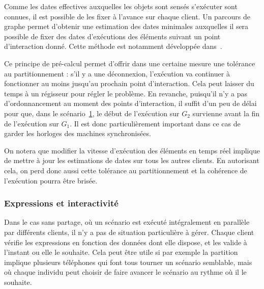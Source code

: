 \documentclass[10pt]{article}
\newcommand\trigger{point d'interaction\xspace}
\begin{document}
Comme les dates effectives auxquelles les objets sont sensés s'exécuter sont connues, il est possible de les fixer à l'avance sur chaque client. 
Un parcours de graphe permet d'obtenir une estimation des dates minimales auxquelles il sera possible de fixer des dates d'exécutions des éléments suivant un point d'interaction donné. 
Cette méthode est notamment développée dans~\cite{celerier2016rethinking}.

Ce principe de pré-calcul permet d'offrir dans une certaine mesure une tolérance au partitionnement : s'il y a une déconnexion, l'exécution va continuer à fonctionner au moins jusqu'au prochain \trigger.
Cela peut laisser du temps à un régisseur pour régler le problème.
En revanche, puisqu'il n'y a pas d'ordonnancement au moment des points d'interaction, il suffit d'un peu de délai pour que, dans le scénario~\ref{scenar.non-interactif}, le début de l'exécution sur $G_2$ survienne avant la fin de l'exécution sur $G_1$. 
Il est donc particulièrement important dans ce cas de garder les horloges des machines synchronisées.

On notera que modifier la vitesse d'exécution des éléments en temps réel implique de mettre à jour les estimations de dates sur tous les autres clients. 
En autorisant cela, on perd donc aussi cette tolérance au partitionnement et la cohérence de l'exécution pourra être brisée.

\begin{figure}[h]
	\centering
	\begin{tikzpicture}
	
	\end{tikzpicture}
	\label{scenar.non-interactif}
\end{figure}


\subsubsection{Expressions et interactivité}
\label{section.expr-interact}
Dans le cas sans partage, où un scénario est exécuté intégralement en parallèle par différents clients, il n'y a pas de situation particulière à gérer.
Chaque client vérifie les expressions en fonction des données dont elle dispose, et les valide à l'instant ou elle le souhaite. 
Cela peut être utile si par exemple la partition implique plusieurs téléphones qui font tous tourner un scénario semblable, mais où chaque individu peut choisir de faire avancer le scénario au rythme où il le souhaite.
\end{document}
